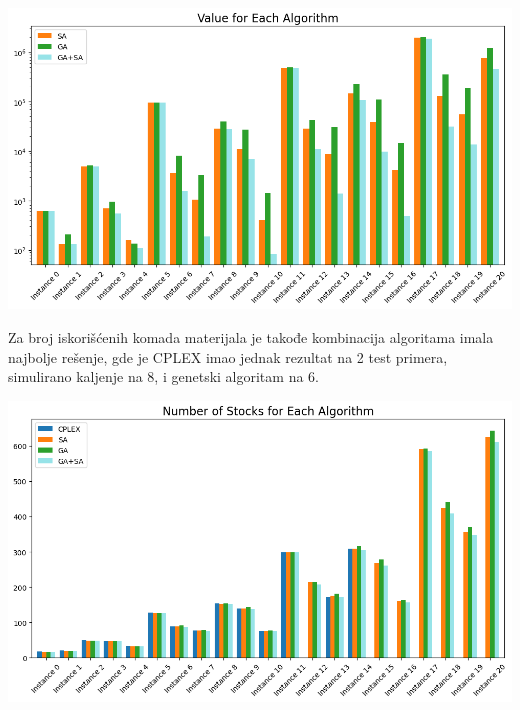 \documentclass[12pt, a4paper]{article}
\begin{document}
\vspace{0.5cm}
\begin{center}
  \hspace{1cm}
  \includegraphics[width=\linewidth]{img/comparison_value.png}
  \hspace{1cm} 
\end{center}
\vspace{0.5cm}

Za broj iskorišćenih komada materijala je takođe kombinacija algoritama imala najbolje rešenje, gde je CPLEX imao jednak rezultat na 2 test primera, simulirano kaljenje na 8, i genetski algoritam na 6.

\vspace{0.5cm}
\begin{center}
  \hspace{1cm}
  \includegraphics[width=\linewidth]{img/comparison_stocks.png}
  \hspace{1cm} 
\end{center}
\vspace{0.5cm}
\end{document}
